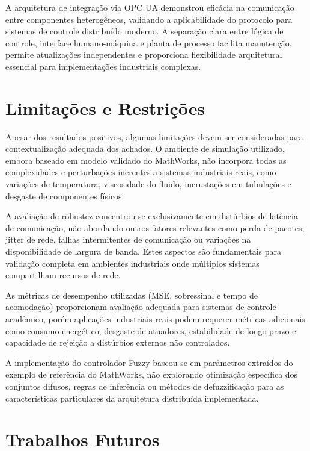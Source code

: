 A arquitetura de integração via OPC UA demonstrou eficácia na comunicação entre componentes heterogêneos, validando a aplicabilidade do protocolo para sistemas de controle distribuído moderno. A separação clara entre lógica de controle, interface humano-máquina e planta de processo facilita manutenção, permite atualizações independentes e proporciona flexibilidade arquitetural essencial para implementações industriais complexas.

\section{Limitações e Restrições}
\label{limitacoes}

Apesar dos resultados positivos, algumas limitações devem ser consideradas para contextualização adequada dos achados. O ambiente de simulação utilizado, embora baseado em modelo validado do MathWorks, não incorpora todas as complexidades e perturbações inerentes a sistemas industriais reais, como variações de temperatura, viscosidade do fluido, incrustações em tubulações e desgaste de componentes físicos.

A avaliação de robustez concentrou-se exclusivamente em distúrbios de latência de comunicação, não abordando outros fatores relevantes como perda de pacotes, jitter de rede, falhas intermitentes de comunicação ou variações na disponibilidade de largura de banda. Estes aspectos são fundamentais para validação completa em ambientes industriais onde múltiplos sistemas compartilham recursos de rede.

As métricas de desempenho utilizadas (MSE, sobressinal e tempo de acomodação) proporcionam avaliação adequada para sistemas de controle acadêmico, porém aplicações industriais reais podem requerer métricas adicionais como consumo energético, desgaste de atuadores, estabilidade de longo prazo e capacidade de rejeição a distúrbios externos não controlados.

A implementação do controlador Fuzzy baseou-se em parâmetros extraídos do exemplo de referência do MathWorks, não explorando otimização específica dos conjuntos difusos, regras de inferência ou métodos de defuzzificação para as características particulares da arquitetura distribuída implementada.

\section{Trabalhos Futuros}
\label{trabalhosfuturos}

